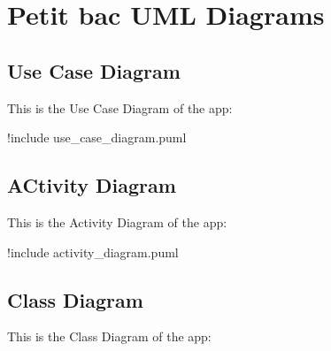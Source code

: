 \documentclass{article}
\begin{document}
\section{Petit bac UML Diagrams}
\subsection{Use Case Diagram}

This is the Use Case Diagram of the app:\\

\begin{plantuml}
!include use_case_diagram.puml
\end{plantuml}

\newpage

\subsection{ACtivity Diagram}

This is the Activity Diagram of the app:\\

\begin{center}
\begin{plantuml}
!include activity_diagram.puml
\end{plantuml}
\end{center}

\subsection{Class Diagram}

This is the Class Diagram of the app:\\
\end{document}
